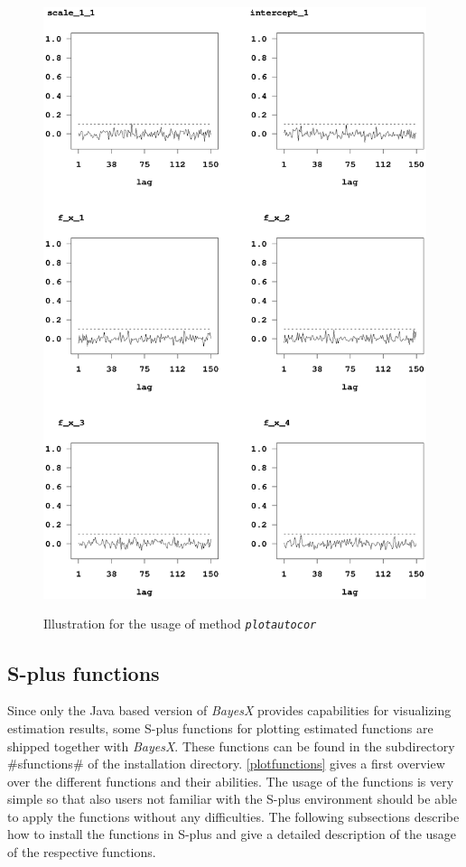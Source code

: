 \begin{figure}[ht]
\begin{center}
\includegraphics[scale=0.8]{grafiken/autocorexample1.ps}
{\em\caption{ \label{autocorexample} Illustration for the usage of
method \em\texttt{plotautocor}}}
\end{center}
\end{figure}

\clearpage

\subsection{S-plus functions}
\label{splus} 

Since only the Java based version of {\em BayesX} provides
capabilities for visualizing estimation results, some S-plus
functions for plotting estimated functions are shipped together
with {\em BayesX}. These functions can be found in the
subdirectory #sfunctions# of the installation directory.
\autoref{plotfunctions} gives a first overview over the different
functions and their abilities. The usage of the functions is very
simple so that also users not familiar with the S-plus environment
should be able to apply the functions without any difficulties.
The following subsections describe how to install the functions in
S-plus and give a detailed description of the usage of the
respective functions.

